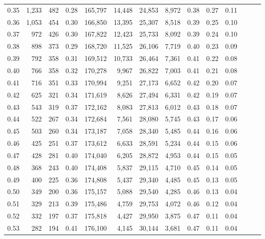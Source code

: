 \begin{tabular}{rrrrrrrrrrrrrr}
0.35 &  1,233 &    482 &  0.28 &  165,797 &   14,448 &  24,853 &   8,972 &  0.38 &  0.27 &      0.11 \\
0.36 &  1,053 &    454 &  0.30 &  166,850 &   13,395 &  25,307 &   8,518 &  0.39 &  0.25 &      0.10 \\
0.37 &    972 &    426 &  0.30 &  167,822 &   12,423 &  25,733 &   8,092 &  0.39 &  0.24 &      0.10 \\
0.38 &    898 &    373 &  0.29 &  168,720 &   11,525 &  26,106 &   7,719 &  0.40 &  0.23 &      0.09 \\
0.39 &    792 &    358 &  0.31 &  169,512 &   10,733 &  26,464 &   7,361 &  0.41 &  0.22 &      0.08 \\
0.40 &    766 &    358 &  0.32 &  170,278 &    9,967 &  26,822 &   7,003 &  0.41 &  0.21 &      0.08 \\
0.41 &    716 &    351 &  0.33 &  170,994 &    9,251 &  27,173 &   6,652 &  0.42 &  0.20 &      0.07 \\
0.42 &    625 &    321 &  0.34 &  171,619 &    8,626 &  27,494 &   6,331 &  0.42 &  0.19 &      0.07 \\
0.43 &    543 &    319 &  0.37 &  172,162 &    8,083 &  27,813 &   6,012 &  0.43 &  0.18 &      0.07 \\
0.44 &    522 &    267 &  0.34 &  172,684 &    7,561 &  28,080 &   5,745 &  0.43 &  0.17 &      0.06 \\
0.45 &    503 &    260 &  0.34 &  173,187 &    7,058 &  28,340 &   5,485 &  0.44 &  0.16 &      0.06 \\
0.46 &    425 &    251 &  0.37 &  173,612 &    6,633 &  28,591 &   5,234 &  0.44 &  0.15 &      0.06 \\
0.47 &    428 &    281 &  0.40 &  174,040 &    6,205 &  28,872 &   4,953 &  0.44 &  0.15 &      0.05 \\
0.48 &    368 &    243 &  0.40 &  174,408 &    5,837 &  29,115 &   4,710 &  0.45 &  0.14 &      0.05 \\
0.49 &    400 &    225 &  0.36 &  174,808 &    5,437 &  29,340 &   4,485 &  0.45 &  0.13 &      0.05 \\
0.50 &    349 &    200 &  0.36 &  175,157 &    5,088 &  29,540 &   4,285 &  0.46 &  0.13 &      0.04 \\
0.51 &    329 &    213 &  0.39 &  175,486 &    4,759 &  29,753 &   4,072 &  0.46 &  0.12 &      0.04 \\
0.52 &    332 &    197 &  0.37 &  175,818 &    4,427 &  29,950 &   3,875 &  0.47 &  0.11 &      0.04 \\
0.53 &    282 &    194 &  0.41 &  176,100 &    4,145 &  30,144 &   3,681 &  0.47 &  0.11 &      0.04 \\

\end{tabular}
